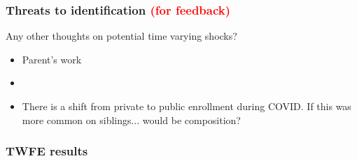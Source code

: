\documentclass{beamer}
\begin{document}
\begin{frame}
    \label{frame:research_feedback}
    \frametitle{Threats to identification \textcolor{red}{(for feedback)}}
        Any other thoughts on potential time varying shocks?
        \begin{itemize}
            \item Parent's work
            \item 
            \item There is a shift from private to public enrollment during COVID. If this was more common on siblings... would be composition?
        \end{itemize}
\end{frame}


\begin{frame}
    \label{frame:twfe}
    \frametitle{TWFE results}
        {
    }
\end{frame}
\end{document}
